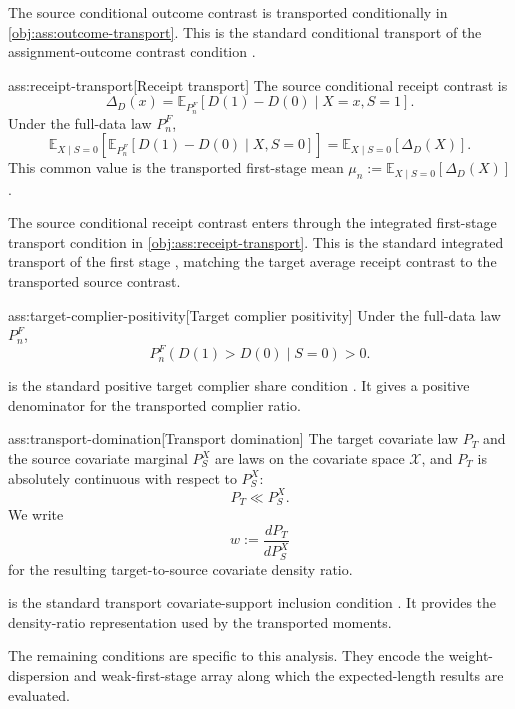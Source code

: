 \documentclass[11pt]{article}
\begin{document}
The source conditional outcome contrast  is transported conditionally in \cref{obj:ass:outcome-transport}. This is the standard conditional transport of the assignment-outcome contrast condition \citep{ChenHuang2025}.

\begin{assumptionv}{ass:receipt-transport}[Receipt transport]
The source conditional receipt contrast is
\[
\Delta_D(x)
=
\mathbb E_{P_n^F}\!\left[D(1)-D(0)\mid X=x,S=1\right].
\]
Under the full-data law \(P_n^F\),
\[
\mathbb E_{X\mid S=0}\!\left[
\mathbb E_{P_n^F}\!\left[D(1)-D(0)\mid X,S=0\right]
\right]
=
\mathbb E_{X\mid S=0}\!\left[\Delta_D(X)\right].
\]
This common value is the transported first-stage mean \(\mu_n:=\mathbb E_{X\mid S=0}[\Delta_D(X)]\).
\end{assumptionv}

The source conditional receipt contrast  enters through the integrated first-stage transport condition in \cref{obj:ass:receipt-transport}. This is the standard integrated transport of the first stage \citep{ChenHuang2025}, matching the target average receipt contrast to the transported source contrast.

\begin{assumptionv}{ass:target-complier-positivity}[Target complier positivity]
Under the full-data law \(P_n^F\),
\[
P_n^F\!\left(D(1)>D(0)\mid S=0\right)>0.
\]
\end{assumptionv}

 is the standard positive target complier share condition \citep{ChenHuang2025}. It gives a positive denominator for the transported complier ratio.

\begin{assumptionv}{ass:transport-domination}[Transport domination]
The target covariate law \(P_T\) and the source covariate marginal \(P_S^X\) are laws on the covariate space \(\mathcal X\), and \(P_T\) is absolutely continuous with respect to \(P_S^X\):
\[
P_T\ll P_S^X.
\]
We write
\[
w:=\frac{dP_T}{dP_S^X}
\]
for the resulting target-to-source covariate density ratio.
\end{assumptionv}

 is the standard transport covariate-support inclusion condition \citep{ChenHuang2025}. It provides the density-ratio representation used by the transported moments.

The remaining conditions are specific to this analysis. They encode the weight-dispersion and weak-first-stage array along which the expected-length results are evaluated.
\end{document}
